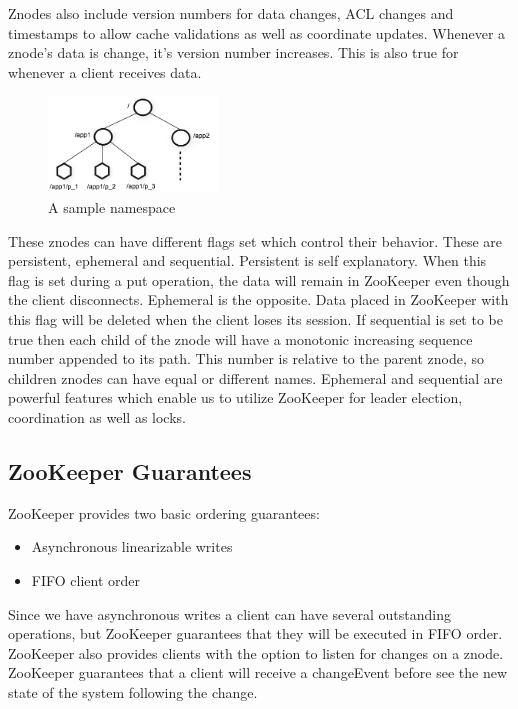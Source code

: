 Znodes also include version numbers for data changes, ACL changes and timestamps to allow cache validations as well as coordinate updates. Whenever a znode's data is change, it's version number increases. This is also true for whenever a client receives data. 

\begin{figure}[h]
    \centering
    \includegraphics[width=0.4\textwidth]{software/zknamespace.jpg}
    \caption{A sample namespace}
    \label{fig:zk_namespace}
\end{figure}

These znodes can have different flags set which control their behavior. These are persistent, ephemeral and sequential. Persistent is self explanatory. When this flag is set during a put operation, the data will remain in ZooKeeper even though the client disconnects. Ephemeral is the opposite. Data placed in ZooKeeper with this flag will be deleted when the client loses its session. If sequential is set to be true then each child of the znode will have a monotonic increasing sequence number appended to its path. This number is relative to the parent znode, so children znodes can have equal or different names. Ephemeral and sequential are powerful features which enable us to utilize ZooKeeper for leader election, coordination as well as locks. 

\subsection{ZooKeeper Guarantees}
ZooKeeper provides two basic ordering guarantees:

\begin{itemize}
	\item Asynchronous linearizable writes
 	\item FIFO client order
\end{itemize}

Since we have asynchronous writes a client can have several outstanding operations, but ZooKeeper guarantees that they will be executed in FIFO order. ZooKeeper also provides clients with the option to listen for changes on a znode. ZooKeeper guarantees that a client will receive a changeEvent before see the new state of the system following the change. 

